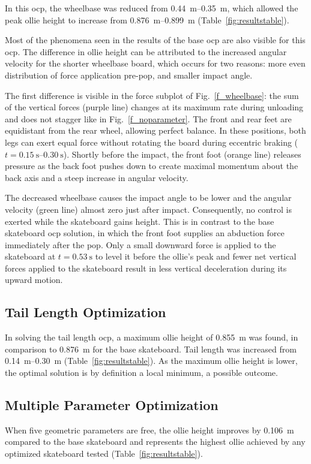 \documentclass[default,iicol]{sn-jnl}
\begin{document}
In this \gls{ocp}, the wheelbase was reduced from \SIrange{0.44}{0.35}{\meter}, which allowed the peak ollie height to increase from \SIrange{0.876}{0.899}{\meter} (Table~\ref{fig:resultstable}).

Most of the phenomena seen in the results of the base \gls{ocp} are also visible for this \gls{ocp}.
The difference in ollie height can be attributed to the increased angular velocity for the shorter wheelbase board, which occurs for two reasons: more even distribution of force application pre-pop, and smaller impact angle.

The first difference is visible in the force subplot of Fig.~\ref{f_wheelbase}: the sum of the vertical forces (purple line) changes at its maximum rate during unloading and does not stagger like in Fig.~\ref{f_noparameter}.
The front and rear feet are equidistant from the rear wheel, allowing perfect balance.
In these positions, both legs can exert equal force without rotating the board during eccentric braking ($t=\SIrange{0.15}{0.30}{\second}$). 
Shortly before the impact, the front foot (orange line) releases pressure as the back foot pushes down to create maximal momentum about the back axis and a steep increase in angular velocity. 

The decreased wheelbase causes the impact angle to be lower and the angular velocity (green line) almost zero just after impact.
Consequently, no control is exerted while the skateboard gains height.
This is in contrast to the base skateboard \gls{ocp} solution, in which the front foot supplies an abduction force immediately after the pop.
Only a small downward force is applied to the skateboard at $t=\SI{0.53}{\second}$ to level it before the ollie's peak and fewer net vertical forces applied to the skateboard result in less vertical deceleration during its upward motion.

\subsection{Tail Length Optimization}
In solving the tail length \gls{ocp}, a maximum ollie height of \SI{0.855}{\meter} was found, in comparison to \SI{0.876}{\meter} for the base skateboard. Tail length was increased from \SIrange{0.14}{0.30}{\meter} (Table~\ref{fig:resultstable}). As the maximum ollie height is lower, the optimal solution is by definition a local minimum, a possible outcome.

\subsection{Multiple Parameter Optimization}
When five geometric parameters are free, the ollie height improves by \SI{0.106}{\meter} compared to the base skateboard and represents the highest ollie achieved by any optimized skateboard tested (Table~\ref{fig:resultstable}). 
\end{document}
